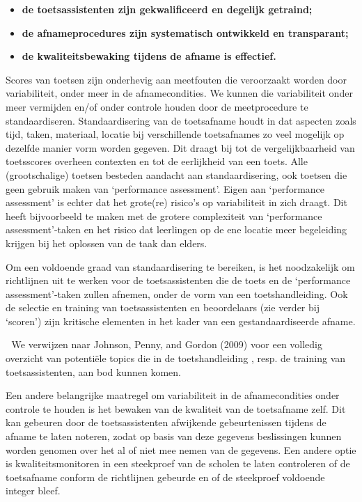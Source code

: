 \documentclass[
  letterpaper,
]{report}
\providecommand{\tightlist}{%
  \setlength{\itemsep}{0pt}\setlength{\parskip}{0pt}}
\begin{document}
\begin{itemize}
\tightlist
\item
  \textbf{de toetsassistenten zijn gekwalificeerd en degelijk getraind;}
\item
  \textbf{de afnameprocedures zijn systematisch ontwikkeld en
  transparant;}
\item
  \textbf{de kwaliteitsbewaking tijdens de afname is effectief.}
\end{itemize}

Scores van toetsen zijn onderhevig aan meetfouten die veroorzaakt worden
door variabiliteit, onder meer in de afnamecondities. We kunnen die
variabiliteit onder meer vermijden en/of onder controle houden door de
meetprocedure te standaardiseren. Standaardisering van de toetsafname
houdt in dat aspecten zoals tijd, taken, materiaal, locatie bij
verschillende toetsafnames zo veel mogelijk op dezelfde manier vorm
worden gegeven. Dit draagt bij tot de vergelijkbaarheid van toetsscores
overheen contexten en tot de eerlijkheid van een toets. Alle
(grootschalige) toetsen besteden aandacht aan standaardisering, ook
toetsen die geen gebruik maken van `performance assessment'. Eigen aan
`performance assessment' is echter dat het grote(re) risico's op
variabiliteit in zich draagt. Dit heeft bijvoorbeeld te maken met de
grotere complexiteit van `performance assessment'-taken en het risico
dat leerlingen op de ene locatie meer begeleiding krijgen bij het
oplossen van de taak dan elders.

Om een voldoende graad van standaardisering te bereiken, is het
noodzakelijk om richtlijnen uit te werken voor de toetsassistenten die
de toets en de `performance assessment'-taken zullen afnemen, onder de
vorm van een toetshandleiding. Ook de selectie en training van
toetsassistenten en beoordelaars (zie verder bij `scoren') zijn
kritische elementen in het kader van een gestandaardiseerde afname.

📖 We verwijzen naar Johnson, Penny, and Gordon (2009) voor een volledig
overzicht van potentiële topics die in de toetshandleiding , resp. de
training van toetsassistenten, aan bod kunnen komen.

Een andere belangrijke maatregel om variabiliteit in de afnamecondities
onder controle te houden is het bewaken van de kwaliteit van de
toetsafname zelf. Dit kan gebeuren door de toetsassistenten afwijkende
gebeurtenissen tijdens de afname te laten noteren, zodat op basis van
deze gegevens beslissingen kunnen worden genomen over het al of niet mee
nemen van de gegevens. Een andere optie is kwaliteitsmonitoren in een
steekproef van de scholen te laten controleren of de toetsafname conform
de richtlijnen gebeurde en of de steekproef voldoende integer bleef.
\end{document}
